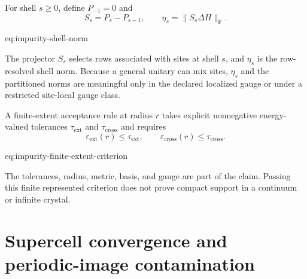For shell $s\geq0$, define $P_{-1}=0$ and
\begin{equation}
    S_s=P_s-P_{s-1},
    \qquad
    \eta_s=\lVert S_s\Delta H\rVert_{\mathrm F}.
    \label{eq:impurity-shell-norm}
\end{equation}
\begin{equationterms}{eq:impurity-shell-norm}
\end{equationterms}
The projector $S_s$ selects rows associated with sites at shell $s$, and
$\eta_s$ is the row-resolved shell norm. Because a general unitary can mix
sites, $\eta_s$ and the partitioned norms are meaningful only in the declared
localized gauge or under a restricted site-local gauge class.

A finite-extent acceptance rule at radius $r$ takes explicit nonnegative
energy-valued tolerances $\tau_{\mathrm{ext}}$ and
$\tau_{\mathrm{cross}}$ and requires
\begin{equation}
    \varepsilon_{\mathrm{ext}}(r)\leq\tau_{\mathrm{ext}},
    \qquad
    \varepsilon_{\mathrm{cross}}(r)\leq\tau_{\mathrm{cross}}.
    \label{eq:impurity-finite-extent-criterion}
\end{equation}
\begin{equationterms}{eq:impurity-finite-extent-criterion}
\end{equationterms}
The tolerances, radius, metric, basis, and gauge are part of the claim. Passing
this finite represented criterion does not prove compact support in a continuum
or infinite crystal.

\section{Supercell convergence and periodic-image contamination}

